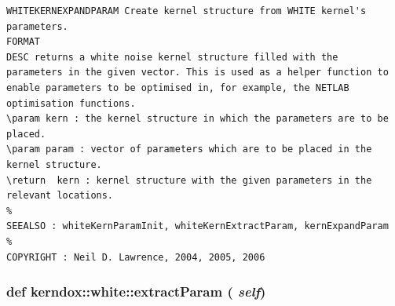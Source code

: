 \footnotesize\begin{verbatim}WHITEKERNEXPANDPARAM Create kernel structure from WHITE kernel's parameters.
FORMAT
DESC returns a white noise kernel structure filled with the
parameters in the given vector. This is used as a helper function to
enable parameters to be optimised in, for example, the NETLAB
optimisation functions.
\param kern : the kernel structure in which the parameters are to be
placed.
\param param : vector of parameters which are to be placed in the
kernel structure.
\return  kern : kernel structure with the given parameters in the
relevant locations.
%
SEEALSO : whiteKernParamInit, whiteKernExtractParam, kernExpandParam
%
COPYRIGHT : Neil D. Lawrence, 2004, 2005, 2006

\end{verbatim}
\normalsize
 \hypertarget{classkerndox_1_1white_f4e9339bff592a00757fdd2f5bf6627a}{
\subsubsection[{extractParam}]{\setlength{\rightskip}{0pt plus 5cm}def kerndox::white::extractParam ( {\em self})}}
\label{classkerndox_1_1white_f4e9339bff592a00757fdd2f5bf6627a}




